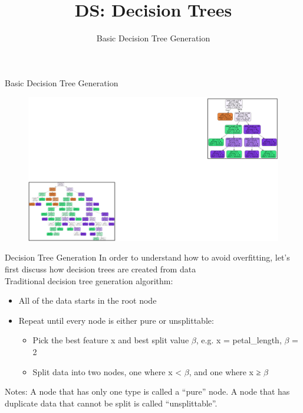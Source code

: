 \documentclass[aspectratio=169]{../latex_main/tntbeamer}  %
\title[Introduction]{DS: Decision Trees}
\subtitle{Basic Decision Tree Generation}
\begin{document}
	
	\maketitle
	\begin{frame}{Basic Decision Tree Generation}
	    \begin{figure}
	        \centering
	        \includegraphics[scale=.3]{Bild40}
	    \end{figure}
	\end{frame}
	
	\begin{frame}{Decision Tree Generation}
	    In order to understand how to avoid overfitting, let’s first discuss how decision trees are created from data\\
	    \bigskip
	    Traditional decision tree generation algorithm: 
	    \begin{itemize}
	        \item All of the data starts in the root node
	        \item Repeat until every node is either pure or unsplittable:
	        \begin{itemize}
	            \item Pick the best feature x and best split value $\beta$, e.g. x = petal\_length, $\beta$ = 2
	            \item Split data into two nodes, one where x < $\beta$, and one where x ≥ $\beta$
	        \end{itemize}
	    \end{itemize}
	    
	    
Notes: A node that has only one type is called a “pure” node. A node that has duplicate data that cannot be split is called “unsplittable”.

	\end{frame}
	
\end{document}
